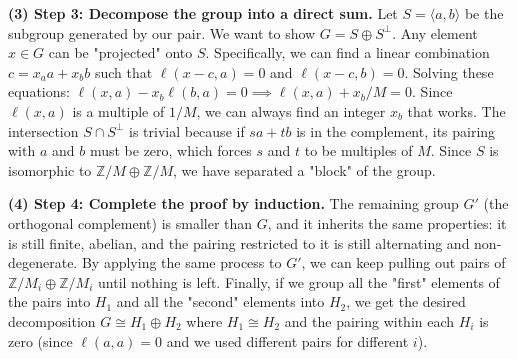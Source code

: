 \begin{solution}
\textbf{(3) Step 3: Decompose the group into a direct sum.}
Let $S = \langle a, b \rangle$ be the subgroup generated by our pair. We want to show $G = S \oplus S^\perp$.
Any element $x \in G$ can be "projected" onto $S$. Specifically, we can find a linear combination $c = x_a a + x_b b$ such that $\ell(x-c, a) = 0$ and $\ell(x-c, b) = 0$.
Solving these equations:
$\ell(x, a) - x_b \ell(b, a) = 0 \implies \ell(x, a) + x_b/M = 0$.
Since $\ell(x, a)$ is a multiple of $1/M$, we can always find an integer $x_b$ that works.
The intersection $S \cap S^\perp$ is trivial because if $sa+tb$ is in the complement, its pairing with $a$ and $b$ must be zero, which forces $s$ and $t$ to be multiples of $M$.
Since $S$ is isomorphic to $\mathbb{Z}/M \oplus \mathbb{Z}/M$, we have separated a "block" of the group.

\textbf{(4) Step 4: Complete the proof by induction.}
The remaining group $G'$ (the orthogonal complement) is smaller than $G$, and it inherits the same properties: it is still finite, abelian, and the pairing restricted to it is still alternating and non-degenerate.
By applying the same process to $G'$, we can keep pulling out pairs of $\mathbb{Z}/M_i \oplus \mathbb{Z}/M_i$ until nothing is left.
Finally, if we group all the "first" elements of the pairs into $H_1$ and all the "second" elements into $H_2$, we get the desired decomposition $G \cong H_1 \oplus H_2$ where $H_1 \cong H_2$ and the pairing within each $H_i$ is zero (since $\ell(a, a) = 0$ and we used different pairs for different $i$).
\end{solution}

